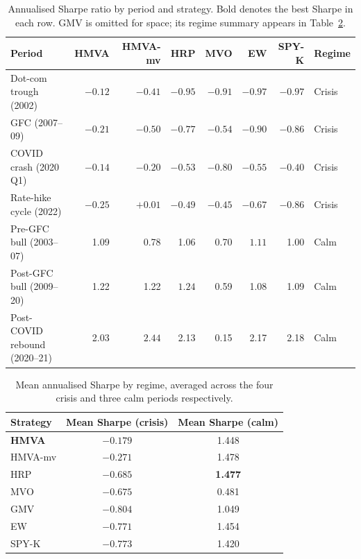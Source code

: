 \documentclass[a4paper,12pt]{report}
\begin{document}
\begin{table}[H]
  \centering
  \caption{Annualised Sharpe ratio by period and strategy. Bold denotes
           the best Sharpe in each row. GMV is omitted for space; its
           regime summary appears in Table~\ref{tab:regime-agg}.}
  \label{tab:crisis-sharpe}
  \begin{tabular}{@{}lrrrrrrl@{}}
    \toprule
    Period & HMVA & HMVA-mv & HRP & MVO & EW & SPY-K & Regime \\
    \midrule
    Dot-com trough (2002) &
      $\mathbf{-0.12}$ & $-0.41$ & $-0.95$ & $-0.91$ & $-0.97$ & $-0.97$
      & Crisis \\
    GFC (2007--09) &
      $\mathbf{-0.21}$ & $-0.50$ & $-0.77$ & $-0.54$ & $-0.90$ & $-0.86$
      & Crisis \\
    COVID crash (2020 Q1) &
      $\mathbf{-0.14}$ & $-0.20$ & $-0.53$ & $-0.80$ & $-0.55$ & $-0.40$
      & Crisis \\
    Rate-hike cycle (2022) &
      $-0.25$ & $\mathbf{+0.01}$ & $-0.49$ & $-0.45$ & $-0.67$ & $-0.86$
      & Crisis \\
    \midrule
    Pre-GFC bull (2003--07) &
      1.09 & 0.78 & 1.06 & 0.70 & $\mathbf{1.11}$ & 1.00
      & Calm \\
    Post-GFC bull (2009--20) &
      1.22 & 1.22 & $\mathbf{1.24}$ & 0.59 & 1.08 & 1.09
      & Calm \\
    Post-COVID rebound (2020--21) &
      2.03 & $\mathbf{2.44}$ & 2.13 & 0.15 & 2.17 & 2.18
      & Calm \\
    \bottomrule
  \end{tabular}
\end{table}

\begin{table}[H]
  \centering
  \caption{Mean annualised Sharpe by regime, averaged across the four
           crisis and three calm periods respectively.}
  \label{tab:regime-agg}
  \begin{tabular}{@{}lcc@{}}
    \toprule
    Strategy & Mean Sharpe (crisis) & Mean Sharpe (calm) \\
    \midrule
    \textbf{HMVA}   & $\mathbf{-0.179}$ & 1.448 \\
    HMVA-mv         & $-0.271$           & 1.478 \\
    HRP             & $-0.685$           & \textbf{1.477} \\
    MVO             & $-0.675$           & 0.481 \\
    GMV             & $-0.804$           & 1.049 \\
    EW              & $-0.771$           & 1.454 \\
    SPY-K           & $-0.773$           & 1.420 \\
    \bottomrule
  \end{tabular}
\end{table}
\end{document}
